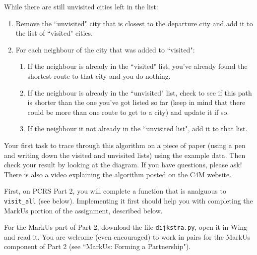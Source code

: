 \documentclass{assignment}
\begin{document}
While there are still unvisited cities left in the list:
\begin{enumerate}
\item Remove the ``unvisited" city that is closest to the departure city and add it to the list of ``visited" cities.
\item For each neighbour of the city that was added to ``visited":
\begin{enumerate}
\item If the neighbour is already in the ``visited" list, you've already found the shortest route to that city and you do nothing. 
\item If the neighbour is already in the ``unvisited" list, check to see if this path is shorter than the one you've got listed so far (keep in mind that there could be more than one route to get to a city) and update it if so.
\item If the neighbour it not already in the ``unvisited list", add it to that list.
\end{enumerate}
\end{enumerate}


Your first task to trace through this algorithm on a piece of paper (using a pen and writing down the visited and unvisited lists) using the example data. Then check your result by looking at the diagram.  If you have questions, please ask!  There is also a video explaining the algorithm posted on the C4M website. 

First, on PCRS Part 2, you will complete a function that is analguous to \verb;visit_all; (see below). Implementing it first should help you with completing the MarkUs portion of the assignment, described below.

For the MarkUs part of Part 2, download the file \verb|dijkstra.py|, open it in Wing and read it.  You are welcome (even encouraged) to work in pairs for the MarkUs component of Part 2 (see ``MarkUs: Forming a Partnership"). 
\end{document}
